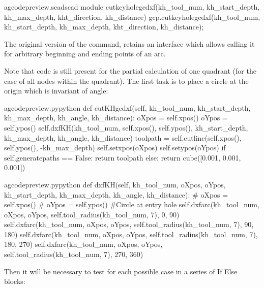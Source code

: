 \documentclass{ltxdoc}
\begin{document}
\lstset{firstnumber=\thegcpscad}
\begin{writecode}{a}{gcodepreview.scad}{scad}
module cutkeyholegcdxf(kh_tool_num, kh_start_depth, kh_max_depth, kht_direction, kh_distance){
    gcp.cutkeyholegcdxf(kh_tool_num, kh_start_depth, kh_max_depth, kht_direction, kh_distance);
}

\end{writecode}
\addtocounter{gcpscad}{4}

The original version of the command,  retains an interface which allows calling it for arbitrary beginning and ending points of an arc. 

Note that code is still present for the partial calculation of one quadrant (for the case of all nodes within the quadrant). The first task is to place a circle at the origin which is invariant of angle:
 
\lstset{firstnumber=\thegcpy}
\begin{writecode}{a}{gcodepreview.py}{python}
    def cutKHgcdxf(self, kh_tool_num, kh_start_depth, kh_max_depth, kh_angle, kh_distance):
        oXpos = self.xpos()
        oYpos = self.ypos()
        self.dxfKH(kh_tool_num, self.xpos(), self.ypos(), kh_start_depth, kh_max_depth, kh_angle, kh_distance)
        toolpath = self.cutline(self.xpos(), self.ypos(), -kh_max_depth)
        self.setxpos(oXpos)
        self.setypos(oYpos)
        if self.generatepaths == False:
            return toolpath
        else: 
            return cube([0.001, 0.001, 0.001])

\end{writecode}
\addtocounter{gcpy}{12}

\lstset{firstnumber=\thegcpy}
\begin{writecode}{a}{gcodepreview.py}{python}
    def dxfKH(self, kh_tool_num, oXpos, oYpos, kh_start_depth, kh_max_depth, kh_angle, kh_distance):
#        oXpos = self.xpos()
#        oYpos = self.ypos()
#Circle at entry hole
        self.dxfarc(kh_tool_num, oXpos, oYpos, self.tool_radius(kh_tool_num, 7), 0, 90)
        self.dxfarc(kh_tool_num, oXpos, oYpos, self.tool_radius(kh_tool_num, 7), 90, 180)
        self.dxfarc(kh_tool_num, oXpos, oYpos, self.tool_radius(kh_tool_num, 7), 180, 270)
        self.dxfarc(kh_tool_num, oXpos, oYpos, self.tool_radius(kh_tool_num, 7), 270, 360)
\end{writecode}
\addtocounter{gcpy}{8}

Then it will be necessary to test for each possible case in a series of If Else blocks:
 
\end{document}
